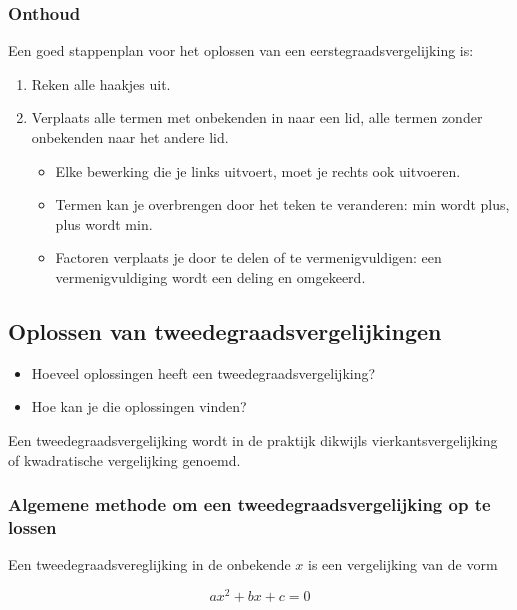 \subsubsection{Onthoud}

\begin{framed}
Een goed stappenplan voor het oplossen van een eerstegraadsvergelijking is:
\begin{enumerate}
	\item Reken alle haakjes uit.
	\item Verplaats alle termen met onbekenden in naar een lid, alle termen zonder onbekenden naar het andere lid.
	       \begin{itemize}
                \item Elke bewerking die je links uitvoert, moet je rechts ook uitvoeren. \item Termen kan je overbrengen door het teken te veranderen: min wordt plus, plus wordt min. \item Factoren verplaats je door te delen of te vermenigvuldigen: een vermenigvuldiging wordt een deling en omgekeerd.
           \end{itemize}
\end{enumerate}
\end{framed}


\newpage

\subsection{Oplossen van tweedegraadsvergelijkingen}

\begin{itemize}
		\item Hoeveel oplossingen heeft een tweedegraadsvergelijking?
	    \item Hoe kan je die oplossingen vinden?
\end{itemize}

Een tweedegraadsvergelijking wordt in de praktijk dikwijls vierkantsvergelijking of kwadratische vergelijking genoemd.

\subsubsection{Algemene methode om een tweedegraadsvergelijking op te lossen}

Een tweedegraadsvereglijking in de onbekende $x$ is een vergelijking van de vorm

\[ ax^2 + bx + c = 0 \]

